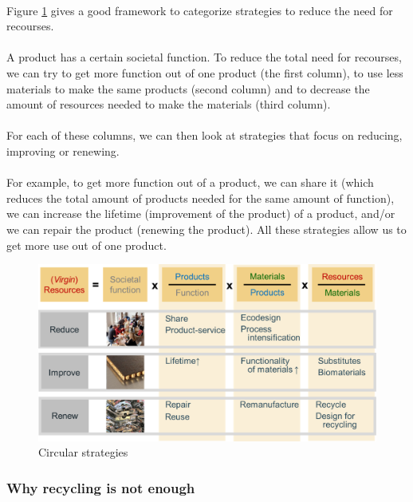 \documentclass[../summary.tex]{subfiles}
\begin{document}
\\
Figure \ref{fig:circularstrategies} gives a good framework to categorize strategies to reduce the need for recourses.\\
\\
A product has a certain societal function. To reduce the total need for recourses, we can try to get more function out of one product (the first column), to use less materials to make the same products (second column) and to decrease the amount of resources needed to make the materials (third column). \\
\\
For each of these columns, we can then look at strategies that focus on reducing, improving or renewing. \\
\\
For example, to get more function out of a product, we can share it (which reduces the total amount of products needed for the same amount of function), we can increase the lifetime (improvement of the product) of a product, and/or we can repair the product (renewing the product). All these strategies allow us to get more use out of one product. 

\begin{figure}[H]
	\centering
	\includegraphics[width=0.83\linewidth]{../images/Circular_strategies}
	\caption{Circular strategies}
	\label{fig:circularstrategies}
\end{figure}

\subsubsection{Why recycling is not enough}
\end{document}
